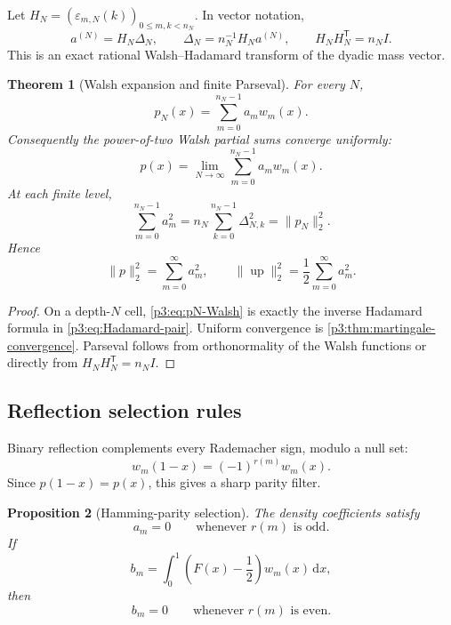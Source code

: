 \documentclass[11pt]{article}
\newtheorem{theorem}{Theorem}[section]
\newtheorem{proposition}[theorem]{Proposition}
\theoremstyle{definition}
\theoremstyle{remark}
\newcommand{\dd}{\,\mathrm d}
\newcommand{\Up}{\operatorname{up}}
\begin{document}
Let $H_N=(\varepsilon_{m,N}(k))_{0\le m,k<n_N}$.  In vector notation,
\begin{equation}\label{p3:eq:Hadamard-pair}
 a^{(N)}=H_N\Delta_N,
 \qquad
 \Delta_N=n_N^{-1}H_Na^{(N)},
 \qquad H_NH_N^{\mathsf T}=n_NI.
\end{equation}
This is an exact rational Walsh--Hadamard transform of the dyadic mass vector.

\begin{theorem}[Walsh expansion and finite Parseval]
\label{p3:thm:Walsh-expansion}
For every $N$,
\begin{equation}\label{p3:eq:pN-Walsh}
 p_N(x)=\sum_{m=0}^{n_N-1}a_mw_m(x).
\end{equation}
Consequently the power-of-two Walsh partial sums converge uniformly:
\begin{equation}\label{p3:eq:p-Walsh}
 p(x)=\lim_{N\to\infty}\sum_{m=0}^{n_N-1}a_mw_m(x).
\end{equation}
At each finite level,
\begin{equation}\label{p3:eq:Walsh-Parseval-finite}
 \sum_{m=0}^{n_N-1}a_m^2
 =n_N\sum_{k=0}^{n_N-1}\Delta_{N,k}^2
 =\|p_N\|_2^2.
\end{equation}
Hence
\begin{equation}\label{p3:eq:Walsh-Parseval-limit}
 \|p\|_2^2=\sum_{m=0}^\infty a_m^2,
 \qquad
 \|\Up\|_2^2=\frac12\sum_{m=0}^\infty a_m^2.
\end{equation}
\end{theorem}

\begin{proof}
On a depth-$N$ cell, \eqref{p3:eq:pN-Walsh} is exactly the inverse Hadamard
formula in \eqref{p3:eq:Hadamard-pair}.  Uniform convergence is
\cref{p3:thm:martingale-convergence}.  Parseval follows from orthonormality of the
Walsh functions or directly from $H_NH_N^{\mathsf T}=n_NI$.
\end{proof}

\subsection{Reflection selection rules}

Binary reflection complements every Rademacher sign, modulo a null set:
\begin{equation}\label{p3:eq:Walsh-reflection}
 w_m(1-x)=(-1)^{r(m)}w_m(x).
\end{equation}
Since $p(1-x)=p(x)$, this gives a sharp parity filter.

\begin{proposition}[Hamming-parity selection]
\label{p3:prop:Walsh-selection}
The density coefficients satisfy
\begin{equation}\label{p3:eq:a-odd-vanish}
 a_m=0\qquad\text{whenever }r(m)\text{ is odd}.
\end{equation}
If
\begin{equation}\label{p3:eq:b_m-F}
 b_m=\int_0^1\left(F(x)-\frac12\right)w_m(x)\dd x,
\end{equation}
then
\begin{equation}\label{p3:eq:b-even-vanish}
 b_m=0\qquad\text{whenever }r(m)\text{ is even}.
\end{equation}
\end{proposition}
\end{document}
